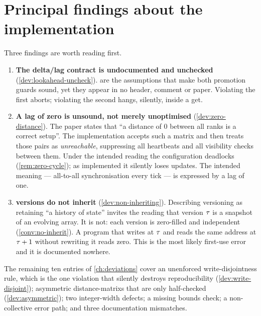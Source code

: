 \section*{Principal findings about the implementation}

Three findings are worth reading first.

\begin{enumerate}[leftmargin=1.5em,itemsep=4pt]

\item \textbf{The \gls{delta}/\gls{lag} contract is undocumented and unchecked}
  (\cref{dev:lookahead-uncheck}).  are the
  assumptions that make both promotion guards sound, yet they appear in no
  header, comment or paper. Violating the first aborts; violating the second
  hangs, silently, inside a \gls{get}.

\item \textbf{A lag of zero is unsound, not merely unoptimised}
  (\cref{dev:zero-distance}). The paper states that ``a distance of 0 between
  all \glspl{rank} is a correct setup''. The implementation accepts such a matrix and
  then treats those pairs as \emph{unreachable}, suppressing all \glspl{heartbeat}
  and all visibility checks between them. Under the intended reading the
  configuration deadlocks (\cref{rem:zero-cycle}); as implemented it silently
  loses updates. The intended meaning --- all-to-all synchronisation every
  tick --- is expressed by a lag of one.

\item \textbf{\Glspl{version} do not inherit} (\cref{dev:non-inheriting}). Describing
  versioning as retaining ``a \gls{history} of state'' invites the reading that
  version $\tau$ is a snapshot of an evolving array. It is not: each version
  is zero-filled and independent (\cref{conv:no-inherit}). A program that
  writes at $\tau$ and reads the same address at $\tau+1$ without rewriting it
  reads zero. This is the most likely first-use error and it is documented
  nowhere.

\end{enumerate}

The remaining ten entries of \cref{ch:deviations} cover an unenforced
write-disjointness rule, which is the one violation that silently destroys
reproducibility (\cref{dev:write-disjoint}); asymmetric \glspl{distance-matrix} that
are only half-checked (\cref{dev:asymmetric}); two integer-width defects; a
missing bounds check; a non-collective error path; and three documentation
mismatches.
